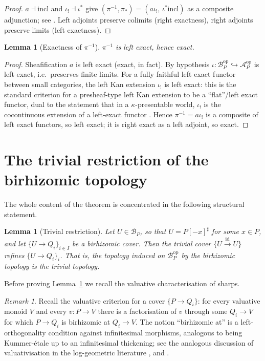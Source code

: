 \documentclass[11pt]{article}
\newtheorem{lemma}[theorem]{Lemma}
\theoremstyle{definition}
\theoremstyle{remark}
\newtheorem{remark}[theorem]{Remark}
\newcommand{\Acal}{\mathcal{A}}
\newcommand{\Bcal}{\mathcal{B}}
\newcommand{\op}{\mathrm{op}}
\begin{document}
\begin{proof}
$a \dashv \mathrm{incl}$ and $\iota_! \dashv \iota^*$ give
$(\pi^{-1}, \pi_*) = (a \iota_!,\, \iota^* \mathrm{incl})$ as a composite
adjunction; see \cite[\S IV.1]{MM92}.  Left adjoints preserve colimits (right
exactness), right adjoints preserve limits (left exactness).
\end{proof}

\begin{lemma}[Exactness of $\pi^{-1}$]\label{lem:pullbackexact}
$\pi^{-1}$ is left exact, hence exact.
\end{lemma}

\begin{proof}
Sheafification $a$ is left exact (exact, in fact).  By hypothesis
$\iota : \Bcal_P^{\op} \hookrightarrow \Acal_P^{\op}$ is left exact, i.e.\
preserves finite limits.  For a fully faithful left exact functor between
small categories, the left Kan extension $\iota_!$ is left exact: this is the
standard criterion for a presheaf-type left Kan extension to be a
``flat''/left exact functor, dual to the statement that in a
$\kappa$-presentable world, $\iota_!$ is the cocontinuous extension of a
left-exact functor
\cite[Expos\'e I, \S 5]{SGA4}\cite[\S X.3, \S VII.5]{MM92}.  Hence
$\pi^{-1} = a \iota_!$ is a composite of left exact functors, so left exact;
it is right exact as a left adjoint, so exact.
\end{proof}

\section{The trivial restriction of the birhizomic topology}\label{sec:key}

The whole content of the theorem is concentrated in the following structural
statement.

\begin{lemma}[Trivial restriction]\label{lem:sharptrivial}
Let $U \in \Bcal_P$, so that $U = P[-x]^{\sharp}$ for some $x \in P$, and let
$\{U \to Q_i\}_{i \in I}$ be a birhizomic cover.  Then the trivial cover
$\{U \xrightarrow{\ \mathrm{id}\ } U\}$ refines
$\{U \to Q_i\}_{i}$.  That is, the topology induced on $\Bcal_P^{\op}$ by the
birhizomic topology is the trivial topology.
\end{lemma}

Before proving Lemma~\ref{lem:sharptrivial} we recall the valuative
characterisation of sharps.

\begin{remark}\label{rmk:valuativecrit}
Recall the valuative criterion for a cover
$\{P \to Q_i\}$: for every valuative monoid $V$ and every $v : P \to V$ there
is a factorisation of $v$ through some $Q_i \to V$ for which $P \to Q_i$ is
birhizomic at $Q_i \to V$.  The notion ``birhizomic at'' is a left-orthogonality
condition against infinitesimal morphisms, analogous to being
Kummer-\'etale up to an infinitesimal thickening; see the analogous discussion
of valuativisation in the log-geometric literature \cite[\S 2]{Holmes},
\cite[{\S}~2]{Kat89} and \cite{Ogus18}.
\end{remark}
\end{document}
